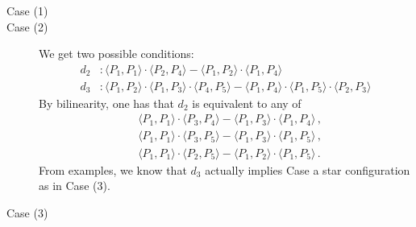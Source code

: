 \documentclass[12pt, a4paper, reqno, captions=tableheading,bibliography=totoc]{scrartcl}
\theoremstyle{plain}
\theoremstyle{definition}
\begin{document}
\begin{description}
 \item[Case (1)]
 \item[Case (2)]
 We get two possible conditions:
 \begin{align}
  d_2 &: \langle P_1, P_1 \rangle\cdot \langle P_2, P_4\rangle -
  \langle P_1, P_2 \rangle \cdot \langle P_1, P_4 \rangle \label{rango9_1} \\
  d_3 &: \langle P_1,P_2 \rangle \cdot \langle P_1,P_3\rangle \cdot
  \langle P_4,P_5\rangle -\langle P_1,P_4\rangle \cdot \langle P_1,P_5\rangle
  \cdot \langle P_2,P_3\rangle  \label{rango9_2}
\end{align}
By bilinearity, one has that $d_2$ is equivalent to any of
\begin{equation}
\begin{aligned}
    & \langle P_1, P_1 \rangle\cdot \langle P_3, P_4\rangle -
  \langle P_1, P_3 \rangle \cdot \langle P_1, P_4 \rangle \,, \\
    & \langle P_1, P_1 \rangle\cdot \langle P_3, P_5\rangle -
  \langle P_1, P_3 \rangle \cdot \langle P_1, P_5 \rangle \,, \\
    & \langle P_1, P_1 \rangle\cdot \langle P_2, P_5\rangle -
  \langle P_1, P_2 \rangle \cdot \langle P_1, P_5 \rangle \,.
\end{aligned}
\end{equation}
From examples, we know that $d_3$ actually implies Case a star configuration as in Case (3).
 \item[Case (3)]

\end{description}




\end{document}
